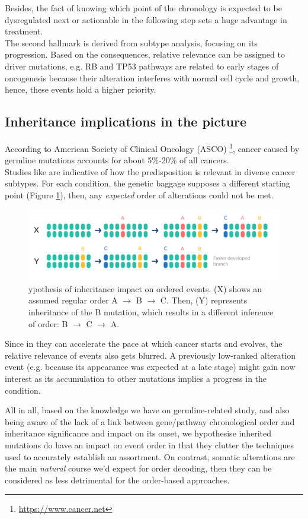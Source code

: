 Besides, the fact of knowing which point of the chronology is expected to be dysregulated next or actionable in the following step sets a huge advantage in treatment.
\\

The second hallmark is derived from subtype analysis, focusing on its progression. Based on the consequences, relative relevance can be assigned to driver mutations, e.g. RB and TP53 pathways are related to early stages of oncogenesis because their alteration interferes with normal cell cycle and growth, hence, these events hold a higher priority.
\\

\subsection{Inheritance implications in the picture}
According to American Society of Clinical Oncology (ASCO) \footnote{\url{https://www.cancer.net}}, cancer caused by germline mutations accounts for about 5\%-20\% of all cancers.
\\

Studies like \cite{DeLaChapelle2004GeneticCancer} are indicative of how the predisposition is relevant in diverse cancer subtypes. For each condition, the genetic baggage supposes a different starting point (Figure \ref{fig:inh}), then, any \textit{expected} order of alterations could not be met.

\begin{figure}[!hb]
    \centering
    \includegraphics[width=\linewidth]{images/NInN.png}
    \caption{ypothesis of inheritance impact on ordered events. (X) shows an assumed regular order A $\rightarrow$ B $\rightarrow$ C. Then, (Y) represents inheritance of the B mutation, which results in a different inference of order: B $\rightarrow$ C $\rightarrow$ A.}
    \label{fig:inh}
\end{figure}


Since in they can accelerate the pace at which cancer starts and evolves, the relative relevance of events also gets blurred. A previously low-ranked alteration event (e.g. because its appearance was expected at a late stage) might gain now interest as its accumulation to other mutations implies a progress in the condition.

All in all, based on the knowledge we have on germline-related study, and also being aware of the lack of a link between gene/pathway chronological order and inheritance significance and impact on its onset, we hypothesise inherited mutations do have an impact on event order in that they clutter the techniques used to accurately establish an assortment. On contrast, somatic alterations are the main \emph{natural} course we'd expect for order decoding, then they can be considered as less detrimental for the order-based approaches.